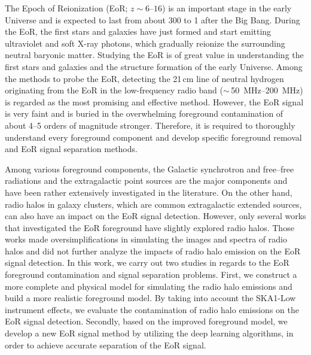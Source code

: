 \begin{englishabstract}

The Epoch of Reionization (EoR; $z \sim \numrange{6}{16}$) is
an important stage in the early Universe and is expected to last
from about \SI{300}{\Myr} to \SI{1}{\Gyr} after the Big Bang.
During the EoR, the first stars and galaxies have just formed and
start emitting ultraviolet and soft X-ray photons,
which gradually reionize the surrounding neutral baryonic matter.
Studying the EoR is of great value in understanding the first stars
and galaxies and the structure formation of  the early Universe.
Among the methods to probe the EoR, detecting the 21\,cm line of
neutral hydrogen originating from the EoR in the low-frequency
radio band ($\sim$\,\SIrange{50}{200}{\MHz}) is regarded as
the most promising and effective method.
However, the EoR signal is very faint and is buried in the overwhelming
foreground contamination of about 4--5 orders of magnitude stronger.
Therefore, it is required to thoroughly understand every foreground
component and develop specific foreground removal and EoR signal
separation methods.

Among various foreground components, the Galactic synchrotron and
free--free radiations and the extragalactic point sources are the
major components and have been rather extensively investigated in
the literature.
On the other hand, radio halos in galaxy clusters, which are common
extragalactic extended sources, can also have an impact on the EoR
signal detection.
However, only several works that investigated the EoR foreground
have slightly explored radio halos.
Those works made oversimplifications in simulating the images and
spectra of radio halos and did not further analyze the impacts of
radio halo emission on the EoR signal detection.
In this work, we carry out two studies in regards to the EoR
foreground contamination and signal separation problems.
First, we construct a more complete and physical model for simulating
the radio halo emissions and build a more realistic foreground model.
By taking into account the SKA1-Low instrument effects, we evaluate
the contamination of radio halo emissions on the EoR signal detection.
Secondly, based on the improved foreground model, we develop a new EoR
signal method by utilizing the deep learning algorithms, in order to
achieve accurate separation of the EoR signal.


\end{englishabstract}
